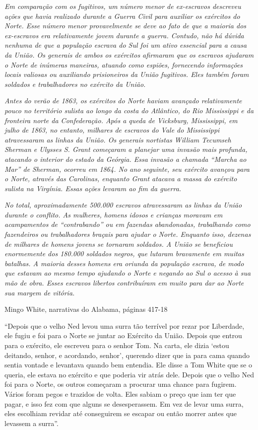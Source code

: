 \emph{Em comparação com os fugitivos, um número menor de ex-escravos
descreveu ações que havia realizado durante a Guerra Civil para auxiliar
os exércitos do Norte. Esse número menor provavelmente se deve ao fato
de que a maioria dos ex-escravos era relativamente jovem durante a
guerra. Contudo, não há dúvida nenhuma de que a população escrava do Sul
foi um ativo essencial para a causa da União. Os generais de ambos os
exércitos afirmaram que os escravos ajudaram o Norte de inúmeras
maneiras, atuando como espiões, fornecendo informações locais valiosas
ou auxiliando prisioneiros da União fugitivos. Eles também foram
soldados e trabalhadores no exército da União.}

\emph{Antes do verão de 1863, os exércitos do Norte haviam avançado
relativamente pouco no território sulista ao longo da costa do
Atlântico, do Rio Mississippi e da fronteira norte da Confederação. Após
a queda de Vicksburg, Mississippi, em julho de 1863, no entanto,
milhares de escravos do Vale do Mississippi atravessaram as linhas da
União. Os generais nortistas William Tecumseh Sherman e Ulysses S. Grant
começaram a planejar uma invasão mais profunda, atacando o interior do
estado da Geórgia. Essa invasão a chamada ``Marcha ao Mar'' de Sherman,
ocorreu em 1864. No ano seguinte, seu exército avançou para o Norte,
através das Carolinas, enquanto Grant atacava a massa do exército
sulista na Virgínia. Essas ações levaram ao fim da guerra. }

\emph{No total, aproximadamente 500.000 escravos atravessaram as linhas
da União durante o conflito. As mulheres, homens idosos e crianças
moravam em acampamentos de ``contrabando'' ou em fazendas abandonadas,
trabalhando como fazendeiros ou trabalhadores braçais para ajudar o
Norte. Enquanto isso, dezenas de milhares de homens jovens se tornaram
soldados. A União se beneficiou enormemente dos 180.000 soldados negros,
que lutaram bravamente em muitas batalhas. A maioria desses homens era
oriunda da população escrava, de modo que estavam ao mesmo tempo
ajudando o Norte e negando ao Sul o acesso à sua mão de obra. Esses
escravos libertos contribuíram em muito para dar ao Norte sua margem de
vitória.}

Mingo White, narrativas do Alabama, páginas 417-18

``Depois que o velho Ned levou uma surra tão terrível por rezar por
Liberdade, ele fugiu e foi para o Norte se juntar ao Exército da União.
Depois que entrou para o exército, ele escreveu para o senhor Tom. Na
carta, ele dizia `estou deitando, senhor, e acordando, senhor', querendo
dizer que ia para cama quando sentia vontade e levantava quando bem
entendia. Ele disse a Tom White que se o queria, ele estava no exército
e que poderia vir atrás dele. Depois que o velho Ned foi para o Norte,
os outros começaram a procurar uma chance para fugirem. Vários foram
pegos e trazidos de volta. Eles sabiam o preço que iam ter que pagar, e
isso fez com que alguns se desesperassem. Em vez de levar uma surra,
eles escolhiam revidar até conseguirem se escapar ou então morrer antes
que levassem a surra''.

